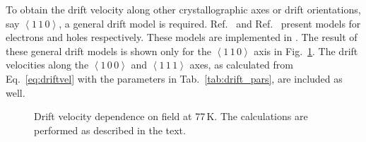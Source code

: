 To obtain the drift velocity along other crystallographic axes or drift orientations, say $\left<1\,1\,0\right>$, a general drift model is required. Ref.~\cite{drift_model_electrons} and Ref.~\cite{Bruyneel2006} present models for electrons and holes respectively. These models are implemented in \SSD{}. The result of these general drift models is shown only for the $\left<1\,1\,0\right>$ axis in Fig.~\ref{fig:drift_vel}. The drift velocities along the $\left<1\,0\,0\right>$ and $\left<1\,1\,1\right>$ axes, as calculated from Eq.~\ref{eq:driftvel} with the parameters in Tab.~\ref{tab:drift_pars}, are included as well.
\begin{figure}[htb]
	\centering
	\caption{Drift velocity dependence on field at 77\,K. The calculations are performed as described in the text.} 
	\label{fig:drift_vel}
\end{figure}

